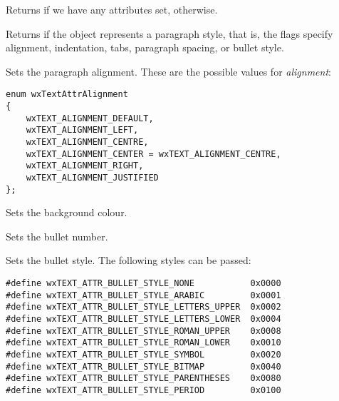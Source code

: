 
Returns \false if we have any attributes set, \true otherwise.

\label{wxrichtextattrisparagraphstyle}


Returns \true if the object represents a paragraph style, that is,
the flags specify alignment, indentation, tabs, paragraph spacing, or
bullet style.

\label{wxrichtextattrsetalignment}


Sets the paragraph alignment. These are the possible values for {\it alignment}:

{\small
\begin{verbatim}
enum wxTextAttrAlignment
{
    wxTEXT_ALIGNMENT_DEFAULT,
    wxTEXT_ALIGNMENT_LEFT,
    wxTEXT_ALIGNMENT_CENTRE,
    wxTEXT_ALIGNMENT_CENTER = wxTEXT_ALIGNMENT_CENTRE,
    wxTEXT_ALIGNMENT_RIGHT,
    wxTEXT_ALIGNMENT_JUSTIFIED
};
\end{verbatim}
}

\label{wxrichtextattrsetbackgroundcolour}


Sets the background colour.

\label{wxrichtextattrsetbulletnumber}


Sets the bullet number.

\label{wxrichtextattrsetbulletstyle}


Sets the bullet style. The following styles can be passed:

{\small
\begin{verbatim}
#define wxTEXT_ATTR_BULLET_STYLE_NONE           0x0000
#define wxTEXT_ATTR_BULLET_STYLE_ARABIC         0x0001
#define wxTEXT_ATTR_BULLET_STYLE_LETTERS_UPPER  0x0002
#define wxTEXT_ATTR_BULLET_STYLE_LETTERS_LOWER  0x0004
#define wxTEXT_ATTR_BULLET_STYLE_ROMAN_UPPER    0x0008
#define wxTEXT_ATTR_BULLET_STYLE_ROMAN_LOWER    0x0010
#define wxTEXT_ATTR_BULLET_STYLE_SYMBOL         0x0020
#define wxTEXT_ATTR_BULLET_STYLE_BITMAP         0x0040
#define wxTEXT_ATTR_BULLET_STYLE_PARENTHESES    0x0080
#define wxTEXT_ATTR_BULLET_STYLE_PERIOD         0x0100
\end{verbatim}
}

